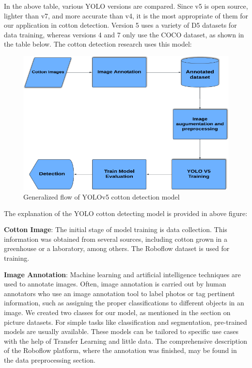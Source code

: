 \documentclass[12pt,a4paper]{report}
\begin{document}
In the above table, various YOLO versions are compared. Since v5 is open source, lighter than v7, and more accurate than v4, it is the most appropriate of them for our application in cotton detection. Version 5 uses a variety of D5 datasets for data training, whereas versions 4 and 7 only use the COCO dataset, as shown in the table below. The cotton detection research uses this model:
\begin{figure}[H]
\begin{center}
\includegraphics[scale=0.65]{images/methodology/Generalized_flow_of_YOLOv5_cotton_detection_model.png}
\caption{Generalized flow of YOLOv5 cotton detection model}
\end{center}
\end{figure}
\par The explanation of the YOLO cotton detecting model is provided in above figure:
\par {\bf{Cotton Image}}: The initial stage of model training is data collection. This information was obtained from several sources, including cotton grown in a greenhouse or a laboratory, among others. The Roboflow dataset is used for training.
\par {\bf{Image Annotation}}: Machine learning and artificial intelligence techniques are used to annotate images. Often, image annotation is carried out by human annotators who use an image annotation tool to label photos or tag pertinent information, such as assigning the proper classifications to different objects in an image. We created two classes for our model, as mentioned in the section on picture datasets. For simple tasks like classification and segmentation, pre-trained models are usually available. These models can be tailored to specific use cases with the help of Transfer Learning and little data. The comprehensive description of the Roboflow platform, where the annotation was finished, may be found in the data preprocessing section.
\end{document}
